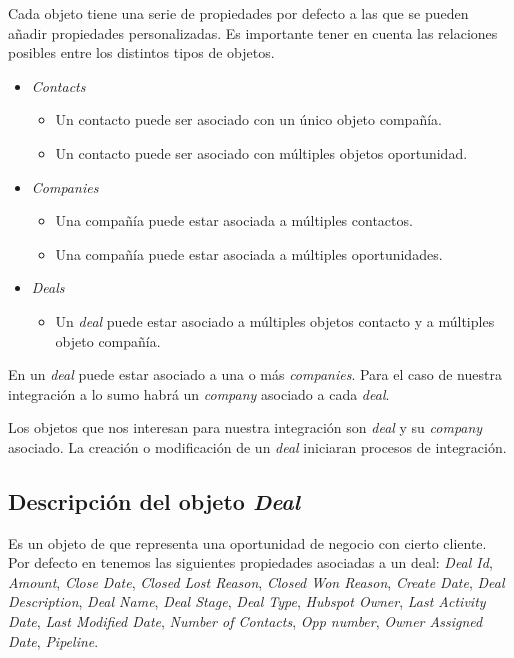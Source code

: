 Cada objeto tiene una serie de propiedades por defecto a las que se pueden añadir propiedades personalizadas.
Es importante tener en cuenta las relaciones posibles entre los distintos tipos de objetos.

\begin{itemize}
	\item \textit{Contacts}
	\begin{itemize}
		\item Un contacto puede ser asociado con un único objeto compañía.
		\item Un contacto puede ser asociado con múltiples objetos oportunidad.
	\end{itemize}
	\item \textit{Companies}
	\begin{itemize}
		\item Una compañía puede estar asociada a múltiples contactos.
		\item Una compañía puede estar asociada a múltiples oportunidades.
	\end{itemize}
	\item \textit{Deals}
	\begin{itemize}
		\item Un \textit{deal} puede estar asociado a múltiples objetos contacto y a múltiples objeto compañía.
	\end{itemize}
\end{itemize}

En \hs{} un \textit{deal} puede estar asociado a una o más \textit{companies}. Para el caso de nuestra integración a lo sumo habrá un \textit{company} asociado a cada \textit{deal}.

Los objetos que nos interesan para nuestra integración son \textit{deal} y su \textit{company} asociado. La creación o modificación de un \textit{deal} iniciaran procesos de integración.



\subsection{Descripción del objeto \textit{Deal}}
	Es un objeto de \hs{} que representa una oportunidad de negocio con cierto cliente. Por defecto en \hs{} tenemos las siguientes propiedades asociadas a un deal:			
		\textit{Deal Id}, \textit{Amount}, \textit{Close Date}, \textit{Closed Lost Reason}, \textit{Closed Won Reason}, \textit{Create Date}, \textit{Deal Description}, \textit{Deal Name}, \textit{Deal Stage}, \textit{Deal Type}, \textit{Hubspot Owner}, \textit{Last Activity Date}, \textit{Last Modified Date}, \textit{Number of Contacts},
		\textit{Opp number}, \textit{Owner Assigned Date}, \textit{Pipeline}.
		

